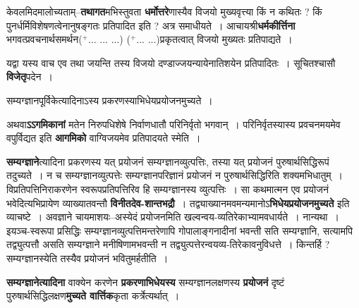 \documentclass[article,12pt,a4paper]{memoir}
\newcommand{\add}[1]{($^{+}$#1)}
\begin{document}
	  \pstart केवलमिदमालोच्यताम्--\textbf{तथागत}मभिस्तुवता \textbf{धर्मोत्तरे}णास्यैव विजयो मुख्यवृत्त्या किं न कथितः ? किं पुनर्धर्मिविशेषणत्वेनानुषङ्गतः प्रतिपादित इति ? अत्र समाधीयते । आचायश्री\textbf{धर्मकीर्त्तिना} भगवत्प्रवचनार्थसमर्थन\add{... ... ...} \add{... ...}प्रकृतत्वात् विजयो मुख्यतः प्रतिपाद्यते ।
	\pend
      

	  \pstart यद्वा यस्य वाच एव तथा जयन्ति तस्य विजयो दण्डाज्जयन्यायेनातिशयेन प्रतिपादितः । सूचितश्चासौ \textbf{विजेतृ}पदेन ।
	\pend
	  \bigskip
	  \begingroup
	

	  \pstart सम्यग्ज्ञानपूर्विकेत्यादिनाऽस्य प्रकरणस्याभिधेयप्रयोजनमुच्यते ।
	\pend
      
	  \endgroup
	

	  \pstart अथवा\textbf{ऽऽगमिकानां} मतेन निरुपधिशेषे निर्वाणधातौ परिनिर्वृतो भगवान् । परिनिर्वृतस्यास्य प्रवचनमयमेव वपुर्विद्यत इति \textbf{आगमिको} वाग्विजयमेव प्रतिपादयते स्मेति ।
	\pend
      

	  \pstart \textbf{सम्यग्ज्ञाने}त्यादिना प्रकरणस्य यत् प्रयोजनं सम्यग्ज्ञानव्युत्पत्तिः, तस्या यत् प्रयोजनं पुरुषार्थसिद्धिरूपं तदुच्यते । न च सम्यग्ज्ञानव्युत्पत्तेः सम्यग्ज्ञानपरिज्ञानं प्रयोजनं न पुरुषार्थसिद्धिरिति शक्यमभिधातुम् । विप्रतिपत्तिनिराकरणेन स्वरूपप्रतिपत्तिरिव हि सम्यग्ज्ञानस्य व्युत्पत्तिः । सा कथमात्मन एव प्रयोजनं भवेदित्यभिप्रायेण व्याख्यातवन्तौ \textbf{विनीतदेव-शान्तभद्रौ} । तद्व्याख्यानमवमन्यमानोऽ\textbf{भिधेयप्रयोजनमुच्यते} इति व्याचष्टे । अवज्ञाने चायमाशयः--अस्येदं प्रयोजनमिति खल्वन्वय-व्यतिरेकाभ्यामवधार्यते । नान्यथा । इयञ्च-स्वरूपा प्रसिद्धिः  सम्यग्ज्ञानव्युत्पत्तिमन्तरेणापि गोपालाङ्गनादीनां भवन्ती सति सम्यग्ज्ञानि, सत्यामपि तद्व्युत्पत्तौ असति सम्यग्ज्ञाने मनीषिणामभवन्ती न तद्व्युत्पत्तेरन्वयव्य-तिरेकावनुविधत्ते । किन्तर्हि ? सम्यग्ज्ञानस्येति तस्यैव प्रयोजनं भवितुमर्हतीति ।
	\pend
      

	  \pstart \textbf{सम्यग्ज्ञानेत्यादिना} वाक्येन करणेन \textbf{प्रकरणाभिधेयस्य} सम्यग्ज्ञानलक्षणस्य \textbf{प्रयोजनं} दृष्टं पुरुषार्थसिद्धिलक्षण\textbf{मुच्यते वार्त्तिक}कृता कर्त्रेत्यर्थात् ।
	\pend
      
\end{document}
